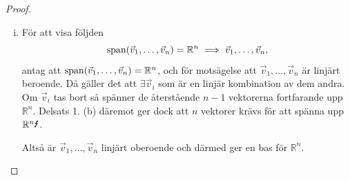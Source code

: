 \begin{theorem}[Bassatsen]
\begin{proof}
\begin{enumerate}
\begin{enumerate}[(i)]
				Mängden $\qty{\vec{v}_1,dots,\vec{v}_n}$ har $n$ stycken vektorer
				i $S\cong\mathbb{R}^d$. Delsats 1. (a) ger att fler än $d$ vektorer
				i $\mathbb{R}^d$ är linjärt beroende. Eftersom $n>d$, är
				$\qty{\vec{v_1},\dots,\vec{v}_n}$ linjärt beroende $\contra$. Altså
				är $\spn(\vec{v}_1,\dots,\vec{v}_n)=\mathbb{R}^n$, och $\vec{v}_1,\dots,\vec{v}_n$
				ger en bas för $\mathbb{R}^n$.
				\item För att visa följden
				$$
					\operatorname{span}(\vec{v}_1,\dots,\vec{v}_n)=\mathbb{R}^n\implies\vec{v}_1,\dots,\vec{v}_n,
				$$ 
				antag att $\spn(\vec{v}_1,\dots,\vec{v}_n)=\mathbb{R}^n$, och för 
				motsägelse att $\vec{v}_1,\dots,\vec{v}_n$ är linjärt beroende. Då
				gäller det att $\exists\vec{v}_i$ som är en linjär kombination av dem
				andra. Om $\vec{v}_i$ tas bort så spänner de återstående $n-1$ vektorerna
				fortfarande upp $\mathbb{R}^n$. Delsats 1. (b) däremot ger dock att
				$n$ vektorer krävs för att spänna upp $\mathbb{R}^n\contra$.

				Altså är $\vec{v}_1,\dots,\vec{v}_n$ linjärt oberoende och därmed
				ger en bas för $\mathbb{R}^n$.
			\end{enumerate}
		\end{enumerate}
	\end{proof}
\end{theorem}

